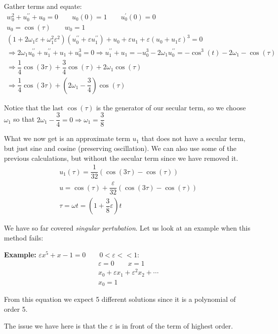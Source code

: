 \noindent Gather terms and equate:
\begin{equation*}
  \begin{gathered}
    w_0^2+u^{\prime\prime}_0+u_0=0\qquad u_0(0) =1\qquad u^{\prime}_0(0)=0\\
    u_0= \cos(\tau)\qquad w_0=1\\
    (1+2\omega_1\varepsilon+\omega_1^2\varepsilon^2)(u^{\prime\prime}_0+\varepsilon u^{\prime\prime}_1)+u_0+\varepsilon u_1+\varepsilon(u_0+u_1\varepsilon)^3=0\\
    \Rightarrow 2\omega_1 u^{\prime\prime}_0+u^{\prime\prime}_1+u_1+u_0^3=0\Rightarrow u^{\prime\prime}_1+u_1=-u_0^3-2\omega_1 u^{\prime\prime}_0 = -\cos^3(t)-2\omega_1-\cos(\tau)\\
    \Rightarrow \dfrac{1}{4}\cos(3\tau)+\dfrac{3}{4}\cos(\tau)+2\omega_1\cos(\tau)\\
    \Rightarrow \dfrac{1}{4}\cos(3\tau)+\left(2\omega_1-\dfrac{3}{4}\right)\cos(\tau)
  \end{gathered}
\end{equation*}\par
\noindent Notice that the last $\cos(\tau)$ is the generator of our secular term, so we choose $\omega_1$ so that $2\omega_1-\dfrac{3}{4}=0\Rightarrow \omega_1 = \dfrac{3}{8}$
\par\bigskip
\noindent What we now get is an approximate term $u_1$ that does not have a secular term, but just sine and cosine (preserving oscillation). We can also use some of the previous calculations, but without the secular term since we have removed it. 
\begin{equation*}
  \begin{gathered}
    u_1(\tau) = \dfrac{1}{32}\left(\cos(3\tau)-\cos(\tau)\right)\\
    u = \cos(\tau) + \dfrac{\varepsilon}{32}\left(\cos(3\tau)-\cos(\tau)\right)\\
    \tau = \omega t = (1+\dfrac{3}{8}\varepsilon)t
  \end{gathered}
\end{equation*}
\par\bigskip
\noindent We have so far covered \textit{singular pertubation}. Let us look at an example when this method fails:
\par\bigskip
\noindent\textbf{Example:} $\varepsilon x^5+x-1=0\qquad 0<\varepsilon<<1$:
\begin{equation*}
  \begin{gathered}
    \varepsilon=0\qquad x=1\\
    x_0+\varepsilon x_1+\varepsilon^2x_2+\cdots\\
    x_0=1
  \end{gathered}
\end{equation*}\par
\noindent From this equation we expect 5 different solutions since it is a polynomial of order 5.\par
\noindent The issue we have here is that the $\varepsilon$ is in front of the term of highest order.
\par\bigskip
